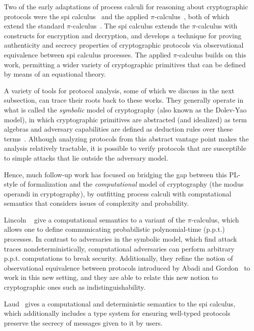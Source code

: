 Two of the early adaptations of process calculi for reasoning about
cryptographic protocols were the spi calculus~\cite{abadi1999calculus} and the
applied $\pi$-calculus~\cite{abadi2001mobile}, both of which extend the standard
$\pi$-calculus~\cite{milner1999communicating}. The spi calculus extends the
$\pi$-calculus with constructs for encryption and decryption, and develops a
technique for proving authenticity and secrecy properties of cryptographic
protocols via observational equivalence between spi calculus processes. The
applied $\pi$-calculus builds on this work, permitting a wider variety of
cryptographic primitives that can be defined by means of an equational theory.

A variety of tools for protocol analysis, some of which we discuss in the next
subsection, can trace their roots back to these works. They generally operate in
what is called the \emph{symbolic} model of cryptography (also known as the
Dolev-Yao model), in which cryptographic primitives are abstracted (and
idealized) as term algebras and adversary capabilities are defined as deduction
rules over these terms~\cite{cortier2011survey}. Although analyzing protocols
from this abstract vantage point makes the analysis relatively tractable, it is
possible to verify protocols that are susceptible to simple attacks that lie
outside the adversary model.

Hence, much follow-up work has focused on bridging the gap between this PL-style
of formalization and the \emph{computational} model of cryptography (the modus
operandi in cryptography), by outfitting process calculi with computational
semantics that considers issues of complexity and probability.

Lincoln \etal~\cite{lincoln1998probabilistic} give a computational semantics to
a variant of the $\pi$-calculus, which allows one to define communicating
probabilistic polynomial-time (p.p.t.) processes. In contrast to adversaries in
the symbolic model, which find attack traces nondeterministically, computational
adversaries can perform arbitrary p.p.t. computations to break
security. Additionally, they refine the notion of observational equivalence
between protocols introduced by Abadi and Gordon~\cite{abadi1999calculus} to
work in this new setting, and they are able to relate this new notion to
cryptographic ones such as indistinguishability.

Laud~\cite{laud2005secrecy} gives a computational and deterministic semantics to
the spi calculus, which additionally includes a type system for ensuring
well-typed protocols preserve the secrecy of messages given to it by users.

